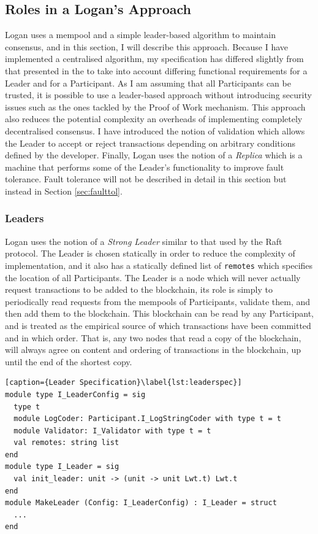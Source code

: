 \documentclass[12pt,a4paper,twoside,openright]{report}
\begin{document}
	\subsection{Roles in a Logan's Approach}
	Logan uses a mempool and a simple leader-based algorithm to maintain consensus, and in this section, I will describe this approach.
	Because I have implemented a centralised algorithm, my specification has differed slightly from that presented in the  to take into account differing functional requirements for a Leader and for a Participant.
	As I am assuming that all Participants can be trusted, it is possible to use a leader-based approach without introducing security issues such as the ones tackled by the Proof of Work mechanism. 
	This approach also reduces the potential complexity an overheads of implementing completely decentralised consensus.
	I have introduced the notion of validation which allows the Leader to accept or reject transactions depending on arbitrary conditions defined by the developer.
	Finally, Logan uses the notion of a \textit{Replica} which is a machine that performs some of the Leader's functionality to improve fault tolerance.
	Fault tolerance will not be described in detail in this section but instead in Section \ref{sec:faulttol}.
	
	\subsubsection*{Leaders}
	Logan uses the notion of a \textit{Strong Leader} similar to that used by the Raft protocol. 
	The Leader is chosen statically in order to reduce the complexity of implementation, and it also has a statically defined list of \texttt{remotes} which specifies the location of all Participants.
	The Leader is a node which will never actually request transactions to be added to the blockchain, its role is simply to periodically read requests from the mempools of Participants, validate them, and then add them to the blockchain.
	This blockchain can be read by any Participant, and is treated as the empirical source of which transactions have been committed and in which order. 
	That is, any two nodes that read a copy of the blockchain, will always agree on content and ordering of transactions in the blockchain, up until the end of the shortest copy.\\

	\begin{lstlisting}[caption={Leader Specification}\label{lst:leaderspec}]
module type I_LeaderConfig = sig
  type t
  module LogCoder: Participant.I_LogStringCoder with type t = t   
  module Validator: I_Validator with type t = t 
  val remotes: string list
end
module type I_Leader = sig
  val init_leader: unit -> (unit -> unit Lwt.t) Lwt.t
end
module MakeLeader (Config: I_LeaderConfig) : I_Leader = struct
  ...
end
	\end{lstlisting}
\end{document}
